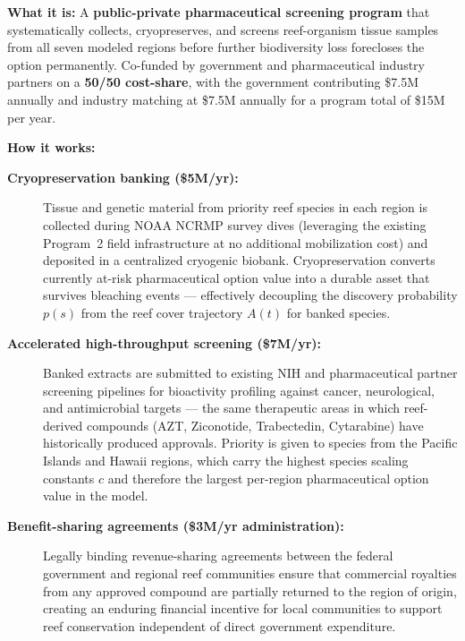 \documentclass[10pt,letterpaper]{article}
\begin{document}
\begin{tcolorbox}[title=Program 6: Pharmaceutical Biodiversity Prospecting Fund --- \$15M Annual Total,
  colback=teal!5, colframe=teal!60!black, fonttitle=\bfseries, breakable]

  \textbf{What it is:} A \textbf{public-private pharmaceutical screening program} that
  systematically collects, cryopreserves, and screens reef-organism tissue samples from all
  seven modeled regions before further biodiversity loss forecloses the option permanently.
  Co-funded by government and pharmaceutical industry partners on a \textbf{50/50 cost-share},
  with the government contributing \$7.5M annually and industry matching at \$7.5M annually for
  a program total of \$15M per year.

  \medskip
  \textbf{How it works:}
  \begin{description}
    \item[\textbf{Cryopreservation banking (\$5M/yr):}] Tissue and genetic material from
    priority reef species in each region is collected during NOAA NCRMP survey dives (leveraging
    the existing Program~2 field infrastructure at no additional mobilization cost) and deposited
    in a centralized cryogenic biobank. Cryopreservation converts currently at-risk pharmaceutical
    option value into a durable asset that survives bleaching events --- effectively decoupling
    the discovery probability $p(s)$ from the reef cover trajectory $A(t)$ for banked species.

    \item[\textbf{Accelerated high-throughput screening (\$7M/yr):}] Banked extracts are
    submitted to existing NIH and pharmaceutical partner screening pipelines for bioactivity
    profiling against cancer, neurological, and antimicrobial targets --- the same therapeutic
    areas in which reef-derived compounds (AZT, Ziconotide, Trabectedin, Cytarabine) have
    historically produced approvals. Priority is given to species from the Pacific Islands and
    Hawaii regions, which carry the highest species scaling constants $c$ and therefore the
    largest per-region pharmaceutical option value in the model.

    \item[\textbf{Benefit-sharing agreements (\$3M/yr administration):}] Legally binding
    revenue-sharing agreements between the federal government and regional reef communities
    ensure that commercial royalties from any approved compound are partially returned to the
    region of origin, creating an enduring financial incentive for local communities to support
    reef conservation independent of direct government expenditure.
  \end{description}


\end{tcolorbox}
\end{document}
